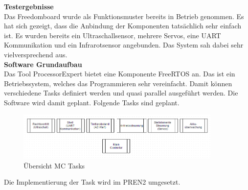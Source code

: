 \textbf{Testergebnisse}\\[0.2cm]
Das Freedomboard wurde als Funktionsmuster bereits in Betrieb genommen. Es hat sich gezeigt, dass die Anbindung der Komponenten tatsächlich sehr einfach ist. Es wurden bereits ein Ultraschallsensor, mehrere Servos, eine UART Kommunikation und ein Infrarotsensor angebunden. Das System sah dabei sehr vielversprechend aus.\\[0.2cm]
\textbf{Software Grundaufbau}\\[0.2cm]
Das Tool ProcessorExpert bietet eine Komponente FreeRTOS an. Das ist ein Betriebssystem, welches das Programmieren sehr vereinfacht. Damit können verschiedene Tasks definiert werden und quasi parallel ausgeführt werden. Die Software wird damit geplant. Folgende Tasks sind geplant.
\begin{figure}[h]
	\centering
	\includegraphics[width=0.9\textwidth]{03_Loesungskonzept/pictures/MC_Tasks.png}
	\caption{Übersicht MC Tasks}
\end{figure}\flushleft
Die Implementierung der Task wird im PREN2 umgesetzt.